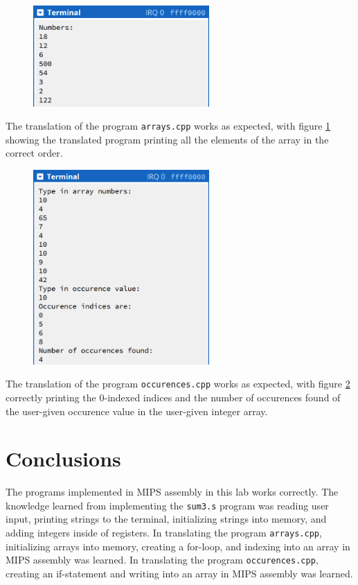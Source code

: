 \documentclass[11pt]{report}
\begin{document}
\newpage

\begin{figure}[h!]
    \centering
    \includegraphics[width=0.6\textwidth]{arrays-terminal_output}
    \label{fig:arrays-terminal_output}
    \caption{}
\end{figure}

The translation of the program \verb|arrays.cpp| works as expected, with figure
\ref{fig:arrays-terminal_output} showing the translated program printing all the elements of the
array in the correct order.

\newpage

\begin{figure}[h!]
    \centering
    \includegraphics[width=0.6\textwidth]{occurences-terminal_output}
    \label{fig:occurences-terminal_output}
    \caption{}
\end{figure}

The translation of the program \verb|occurences.cpp| works as expected, with figure
\ref{fig:occurences-terminal_output} correctly printing the 0-indexed indices and the number of
occurences found of the user-given occurence value in the user-given integer array.


\section*{Conclusions}
The programs implemented in MIPS assembly in this lab works correctly. The knowledge learned from
implementing the \verb|sum3.s| program was reading user input, printing strings to the terminal,
initializing strings into memory, and adding integers inside of registers. In translating the
program \verb|arrays.cpp|, initializing arrays into memory, creating a for-loop, and indexing
into an array in MIPS assembly was learned. In translating the program \verb|occurences.cpp|,
creating an if-statement and writing into an array in MIPS assembly was learned.
\end{document}

